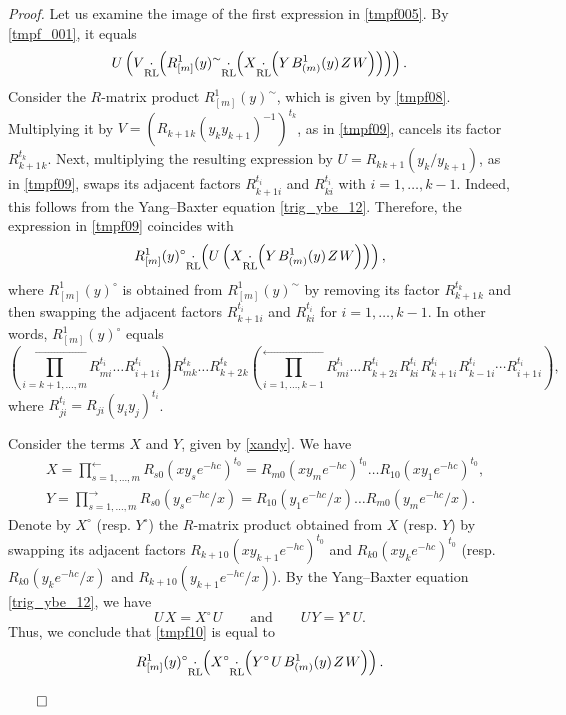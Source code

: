 \documentclass[12pt,a4paper,reqno]{amsart}
\theoremstyle{stil}
\theoremstyle{defi}
\theoremstyle{defi}
\theoremstyle{stil}
\theoremstyle{stil}
\theoremstyle{stil}
\theoremstyle{prim}
\newenvironment{prf}{\noindent \textit{Proof.}}{\null\hfill$\qed$\hskip
2mm\vskip 2mm}
\newcommand{\Fand}{\qquad\text{and}\qquad}
\newcommand{\beq}{\begin{equation}}
\newcommand{\eeq}{\end{equation}}
\newcommand{\ts}{\hspace{1pt}}
\newcommand{\cdotrl}{\mathop{\hspace{-2pt}\underset{\text{RL}}{\cdot}\hspace{-2pt}}}
\begin{document}
\begin{prf}
Let us   examine the image of the first expression in \eqref{tmpf005}.   By \eqref{tmpf_001},   it  equals
\beq\label{tmpf09}
U
\left(
V\cdotrl
	\left(
	R_{[m]}^1 (y)^\sim \cdotrl\left(
 X \cdotrl\left(
 Y \ts B_{(m)}^1(y)\ts Z  \ts W \right)\right)
\right)
\right).
\eeq
Consider the $R$-matrix product $R_{[m]}^1 (y)^\sim$, which is given by \eqref{tmpf08}. Multiplying it by $V=\left(R_{k+1\ts k}(y_k y_{k+1})^{-1}\right)^{t_k}$,  as in \eqref{tmpf09}, cancels its factor 
$R_{k+1\ts k}^{t_k}$.
Next, multiplying the resulting expression by 
$U=R_{k\ts k+1}(y_k/y_{k+1})$, as in \eqref{tmpf09}, swaps its adjacent factors $R_{k+1 i}^{t_i}$ and $R_{k  i}^{t_i}$  with $i=1,\ldots ,k-1$. Indeed, this follows from the Yang--Baxter equation \eqref{trig_ybe_12}.
Therefore, the expression in \eqref{tmpf09} coincides with
\beq\label{tmpf10}
	R_{[m]}^1 (y)^\circ \cdotrl\left(
 U
\left(X \cdotrl\left(
 Y \ts B_{(m)}^1(y)\ts Z  \ts W \right)\right)
\right),
\eeq
where $R_{[m]}^1 (y)^\circ $ is obtained from $R_{[m]}^1 (y)^\sim $
by removing its factor $R_{k+1\ts k}^{t_k}$ and then swapping the adjacent factors $R_{k+1 i}^{t_i}$ and $R_{k  i}^{t_i}$  for $i=1,\ldots ,k-1$. In other words, $R_{[m]}^1 (y)^\circ $   equals
\beq\label{tmpf14}
\left(\prod_{i=k+1,\ldots ,m }^{\longleftarrow}
 R_{m i}^{t_i}  \ldots 
 R_{i+1\ts i}^{t_i}\right)
 R_{m k}^{t_k}  \ldots 
 R_{k+2\ts k}^{t_k} 
\left(\prod_{i=1,\ldots ,k-1 }^{\longleftarrow}
 R_{m i}^{t_i}  \ldots R_{k+2 i}^{t_i} \ts 
R_{k  i}^{t_i} \ts R_{k+1 i}^{t_i} \ts
R_{k-1 i}^{t_i} \cdots
 R_{i+1\ts i}^{t_i}\right),
\eeq
where  $R_{ji}^{t_i}=R_{ji}(y_i y_j)^{t_i}$.

Consider the terms $X$ and $Y$, given by \eqref{xandy}. We have
\begin{align*}
& X=\prod_{s=1,\ldots ,m  }^{\longleftarrow}
R_{s0}(xy_s e^{-hc })^{t_0}=R_{m0}(xy_m e^{-hc })^{t_0}\ldots R_{10}(xy_1 e^{-hc })^{t_0},\\
&Y=\prod_{s=1,\ldots ,m  }^{\longrightarrow}
R_{s0}( y_s e^{- hc }/x) 
=R_{10}( y_1 e^{- hc }/x) \ldots R_{m0}( y_m e^{- hc }/x) 
.
\end{align*}
Denote by $X^\circ$ (resp.  $Y^\circ$) the $R$-matrix product obtained from $X$ (resp. $Y$) by swapping its adjacent factors 
$R_{k+1\ts 0}(xy_{k+1} e^{-hc })^{t_0}$ and $R_{k0}(xy_k e^{-hc })^{t_0}$
(resp. $R_{k0}( y_k e^{- hc }/x)$ and $R_{k+1\ts 0}( y_{k+1} e^{- hc }/x)$).
 By the Yang--Baxter equation \eqref{trig_ybe_12}, we have
$$
U\ts X =X^\circ \ts  U\Fand
U\ts Y =Y^\circ \ts  U.
$$
Thus, we conclude that \eqref{tmpf10} is equal to
\beq\label{tmpf11}
	R_{[m]}^1 (y)^\circ \cdotrl 
\left(X^\circ \cdotrl\left(
 Y^\circ \ts U\ts B_{(m)}^1(y)\ts Z  \ts W \right) 
\right).
\eeq



\end{prf}
\end{document}
